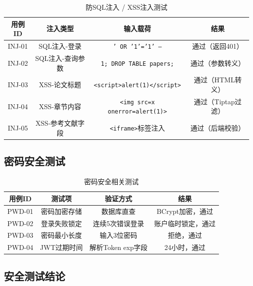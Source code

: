 \begin{table}[htbp]
    \centering
    \caption{防SQL注入 / XSS注入测试}
    \begin{tabular}{|c|c|c|c|}
        \hline
        \textbf{用例ID} & \textbf{注入类型} & \textbf{输入载荷} & \textbf{结果} \\
        \hline
        INJ-01 & SQL注入-登录 & \texttt{' OR '1'='1' --} & 通过（返回401） \\
        \hline
        INJ-02 & SQL注入-查询参数 & \texttt{1; DROP TABLE papers;} & 通过（参数转义） \\
        \hline
        INJ-03 & XSS-论文标题 & \texttt{<script>alert(1)</script>} & 通过（HTML转义） \\
        \hline
        INJ-04 & XSS-章节内容 & \texttt{<img src=x onerror=alert(1)>} & 通过（Tiptap过滤） \\
        \hline
        INJ-05 & XSS-参考文献字段 & \texttt{<iframe>}标签注入 & 通过（后端校验） \\
        \hline
    \end{tabular}
\end{table}

\subsection{密码安全测试}

\begin{table}[htbp]
    \centering
    \caption{密码安全相关测试}
    \begin{tabular}{|c|c|c|c|}
        \hline
        \textbf{用例ID} & \textbf{测试项} & \textbf{验证方式} & \textbf{结果} \\
        \hline
        PWD-01 & 密码加密存储 & 数据库直查 & BCrypt加密，通过 \\
        \hline
        PWD-02 & 登录失败锁定 & 连续5次错误登录 & 账户临时锁定，通过 \\
        \hline
        PWD-03 & 密码最小长度 & 输入3位密码 & 拒绝，通过 \\
        \hline
        PWD-04 & JWT过期时间 & 解析Token exp字段 & 24小时，通过 \\
        \hline
    \end{tabular}
\end{table}

\subsection{安全测试结论}

